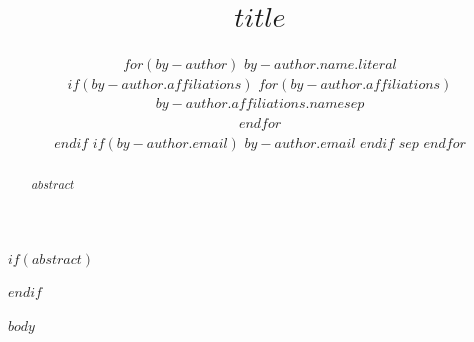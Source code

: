 \documentclass[11pt]{article}
\date{}
\title{$title$}
\author{
$for(by-author)$
  $by-author.name.literal$ \\
  $if(by-author.affiliations)$
    $for(by-author.affiliations)$$by-author.affiliations.name$$sep$ \\ $endfor$ \\
  $endif$
  $if(by-author.email)$
    \texttt{$by-author.email$}
  $endif$
  $sep$ \And
$endfor$
}
\begin{document}
\maketitle

$if(abstract)$
\begin{abstract}
$abstract$
\end{abstract}
$endif$

$body$
\end{document}
